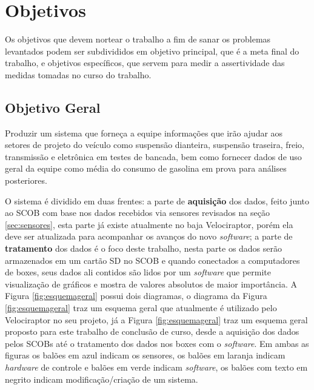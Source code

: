 \section{Objetivos}
\label{sec:objetivos}
Os objetivos que devem nortear o trabalho a fim de sanar os problemas levantados podem ser subdivididos em objetivo principal, que é a meta final do trabalho, e objetivos específicos, que servem para medir a assertividade das medidas tomadas no curso do trabalho.

\subsection{Objetivo Geral}

Produzir um sistema que forneça a equipe informações que irão ajudar aos setores de projeto do veículo como suspensão dianteira, suspensão traseira, freio, transmissão e eletrônica em testes de bancada, bem como fornecer dados de uso geral da equipe como média do consumo de gasolina em prova para análises posteriores. 

O sistema é dividido em duas frentes: a parte de \textbf{aquisição} dos dados, feito junto ao SCOB com base nos dados recebidos via sensores revisados na seção \ref{sec:sensores}, esta parte já existe atualmente no baja Velociraptor, porém ela deve ser atualizada para acompanhar os avanços do novo \textit{software}; a parte de \textbf{tratamento} dos dados é o foco deste trabalho, nesta parte os dados serão armazenados em um cartão SD no SCOB e quando conectados a computadores de boxes, seus dados ali contidos são lidos por um \textit{software} que permite visualização de gráficos e mostra de valores absolutos de maior importância. A Figura \ref{fig:esquemageral} possui dois diagramas, o diagrama da Figura \ref{fig:esquemageral} traz um esquema geral que atualmente é utilizado pelo Velociraptor no seu projeto, já a Figura \ref{fig:esquemageral} traz um esquema geral proposto para este trabalho de conclusão de curso, desde a aquisição dos dados pelos SCOBs até o tratamento dos dados nos boxes com o \textit{software}. Em ambas as figuras os balões em azul indicam os sensores, os balões em laranja indicam \textit{hardware} de controle e balões em verde indicam \textit{software}, os balões com texto em negrito indicam modificação/criação de um sistema.         


